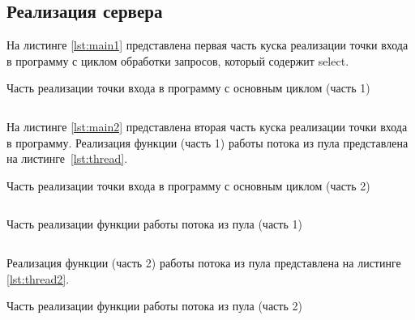 \subsection{Реализация сервера}

На листинге \ref{lst:main1} представлена первая часть куска реализации точки входа в программу с циклом обработки запросов, который содержит select.

\begin{listing}[!htb]
	\caption{Часть реализации точки входа в программу с основным циклом (часть 1)}
	\inputminted[frame=single,fontsize = \footnotesize, linenos, breaklines, xleftmargin = 1.5em,breaksymbol = ""]{c}{../lst/main.c}
	\label{lst:main1}
\end{listing}

\newpage

На листинге \ref{lst:main2} представлена вторая часть куска реализации точки входа в программу.
Реализация функции (часть 1) работы потока из пула представлена на листинге~\ref{lst:thread}.

\begin{listing}[!htb]
\caption{Часть реализации точки входа в программу с основным циклом (часть 2)}
\inputminted[frame=single,fontsize = \footnotesize, linenos, breaklines, xleftmargin = 1.5em,breaksymbol = ""]{c}{../lst/main2.c}
\label{lst:main2}
\end{listing}

\begin{listing}[!htb]
	\caption{Часть реализации функции работы потока из пула (часть 1)}
	\inputminted[frame=single,fontsize = \footnotesize, linenos, breaklines, xleftmargin = 1.5em,breaksymbol = ""]{c}{../lst/thread.c}
	\label{lst:thread}
\end{listing}

Реализация функции (часть 2) работы потока из пула представлена на листинге \ref{lst:thread2}.

\begin{listing}[!htb]
\caption{Часть реализации функции работы потока из пула (часть 2)}
\inputminted[frame=single,fontsize = \footnotesize, linenos, breaklines, xleftmargin = 1.5em,breaksymbol = ""]{c}{../lst/thread2.c}
\label{lst:thread2}
\end{listing}